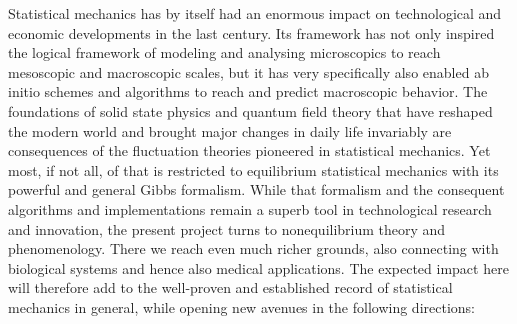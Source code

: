 Statistical mechanics has by itself had an enormous impact on technological and economic
developments in the last century. Its framework has not only inspired the logical framework
of modeling and analysing microscopics to reach mesoscopic and macroscopic scales, but it
has very specifically also enabled ab initio schemes and algorithms to reach and predict
macroscopic behavior.
%
The foundations of solid state physics and quantum field theory that have reshaped the
modern world and brought major changes in daily life invariably are consequences of the
fluctuation theories pioneered in statistical mechanics. Yet most, if not all, of that is
restricted to equilibrium statistical mechanics with its powerful and general Gibbs
formalism.
%
While that formalism and the consequent algorithms and implementations remain a superb tool
in technological research and innovation, the present project turns to nonequilibrium theory
and phenomenology. There we reach even much richer grounds, also connecting with biological
systems and hence also medical applications. The expected impact here will therefore add to
the well-proven and established record of statistical mechanics in general, while opening
new avenues in the following directions:
